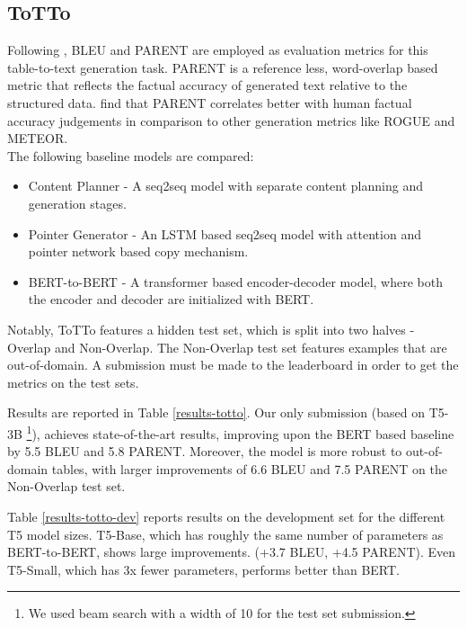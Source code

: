 \documentclass[11pt,a4paper]{article}
\begin{document}
\subsection{ToTTo}
Following \cite{parikh2020totto}, BLEU and PARENT are employed as evaluation metrics for this table-to-text generation task. PARENT is a reference less, word-overlap based metric that reflects the factual accuracy of generated text relative to the structured data. \citet{dhingra2019handling} find that PARENT correlates better with human factual accuracy judgements in comparison to other generation metrics like ROGUE \cite{lin2004rouge} and METEOR.  \\
The following baseline models are compared:
\begin{itemize}
    \item Content Planner \cite{puduppully2019data} -  A seq2seq model with separate content planning and generation stages.
    \item Pointer Generator \cite{see2017get} - An LSTM based seq2seq model with attention and pointer network based copy mechanism.
    \item BERT-to-BERT \cite{rothe2019leveraging} - A transformer based encoder-decoder model, where both the encoder and decoder are initialized with BERT.
\end{itemize}
\par Notably, ToTTo features a hidden test set, which is split into two halves - Overlap and Non-Overlap. The Non-Overlap test set features examples that are out-of-domain. A submission must be made to the leaderboard in order to get the metrics on the test sets. 
\par Results are reported in Table \ref{results-totto}. Our only submission (based on T5-3B \footnote{We used beam search with a width of 10 for the test set submission.}), achieves state-of-the-art results, improving upon the BERT based baseline by 5.5 BLEU and 5.8 PARENT. Moreover, the model is more robust to out-of-domain tables, with larger improvements of 6.6 BLEU and 7.5 PARENT on the Non-Overlap test set.
\par Table \ref{results-totto-dev} reports results on the development set for the different T5 model sizes. T5-Base, which has roughly the same number of parameters as BERT-to-BERT, shows large improvements. (+3.7 BLEU, +4.5 PARENT). Even T5-Small, which  has 3x fewer parameters, performs better than BERT.
\end{document}
